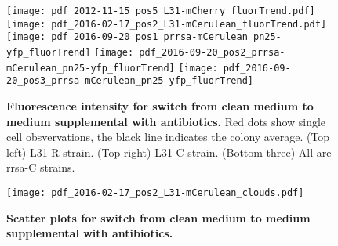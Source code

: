 
\begin{figure}
    \centering    
    \texttt{[image: pdf\_2012-11-15\_pos5\_L31-mCherry\_fluorTrend.pdf]}
    \texttt{[image: pdf\_2016-02-17\_pos2\_L31-mCerulean\_fluorTrend.pdf]} \\
    \texttt{[image: pdf\_2016-09-20\_pos1\_prrsa-mCerulean\_pn25-yfp\_fluorTrend]} %
    \texttt{[image: pdf\_2016-09-20\_pos2\_prrsa-mCerulean\_pn25-yfp\_fluorTrend]}
    \texttt{[image: pdf\_2016-09-20\_pos3\_prrsa-mCerulean\_pn25-yfp\_fluorTrend]}            
    \caption{ 
        \textbf{Fluorescence intensity for switch from clean medium to medium supplemental with antibiotics.}
        Red dots show single cell obsvervations, the black line indicates the colony average.
        (Top left) L31-R strain. 
        (Top right) L31-C strain.
        (Bottom three) All are rrsa-C strains.      
    }
    \label{fig:ribo:fluorsignals}
\end{figure}


\begin{figure}
    \centering    
    \texttt{[image: pdf\_2016-02-17\_pos2\_L31-mCerulean\_clouds.pdf]}
    \caption{ 
        \textbf{Scatter plots for switch from clean medium to medium supplemental with antibiotics.}
    }
    \label{fig:ribo:scatter1}
\end{figure}

